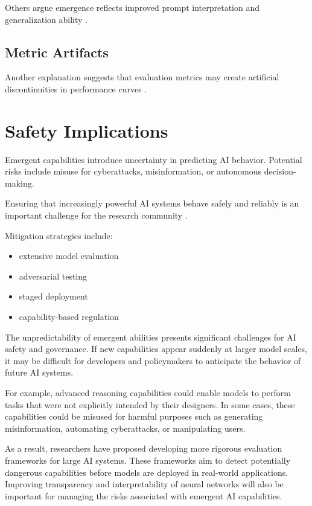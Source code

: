 \documentclass[conference]{IEEEtran}
\begin{document}
Others argue emergence reflects improved prompt interpretation and generalization ability \cite{prasad2023icl}.

\subsection{Metric Artifacts}

Another explanation suggests that evaluation metrics may create artificial discontinuities in performance curves \cite{schaeffer2023emergent}.

\section{Safety Implications}

Emergent capabilities introduce uncertainty in predicting AI behavior. Potential risks include misuse for cyberattacks, misinformation, or autonomous decision-making.

Ensuring that increasingly powerful AI systems behave safely and reliably is an important challenge for the research community \cite{christiano2017rlhf}.

Mitigation strategies include:

\begin{itemize}
\item extensive model evaluation
\item adversarial testing
\item staged deployment
\item capability-based regulation
\end{itemize}

The unpredictability of emergent abilities presents significant challenges for AI safety and governance. If new capabilities appear suddenly at larger model scales, it may be difficult for developers and policymakers to anticipate the behavior of future AI systems.

For example, advanced reasoning capabilities could enable models to perform tasks that were not explicitly intended by their designers. In some cases, these capabilities could be misused for harmful purposes such as generating misinformation, automating cyberattacks, or manipulating users.

As a result, researchers have proposed developing more rigorous evaluation frameworks for large AI systems. These frameworks aim to detect potentially dangerous capabilities before models are deployed in real-world applications. Improving transparency and interpretability of neural networks will also be important for managing the risks associated with emergent AI capabilities.
\end{document}
